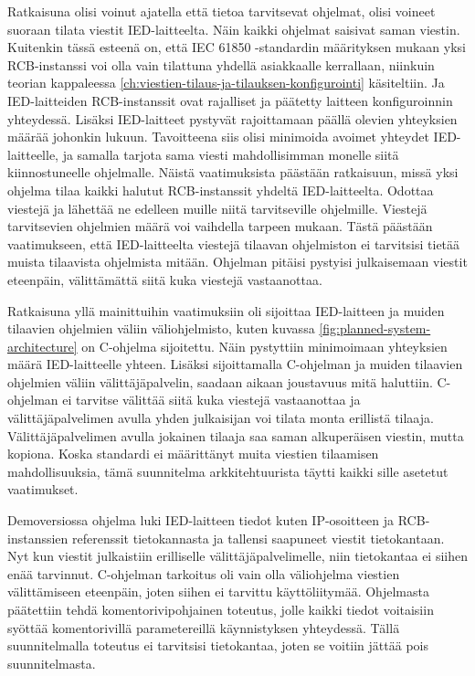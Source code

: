 Ratkaisuna olisi voinut ajatella että tietoa tarvitsevat ohjelmat, olisi voineet suoraan tilata viestit IED-laitteelta. Näin kaikki ohjelmat saisivat saman viestin. Kuitenkin tässä esteenä on, että IEC 61850 -standardin määrityksen mukaan yksi RCB-instanssi voi olla vain tilattuna yhdellä asiakkaalle kerrallaan, niinkuin teorian kappaleessa \ref{ch:viestien-tilaus-ja-tilauksen-konfigurointi} käsiteltiin. Ja IED-laitteiden RCB-instanssit ovat rajalliset ja päätetty laitteen konfiguroinnin yhteydessä. Lisäksi IED-laitteet pystyvät rajoittamaan päällä olevien yhteyksien määrää johonkin lukuun. Tavoitteena siis olisi minimoida avoimet yhteydet IED-laitteelle, ja samalla tarjota sama viesti mahdollisimman monelle siitä kiinnostuneelle ohjelmalle. Näistä vaatimuksista päästään ratkaisuun, missä yksi ohjelma tilaa kaikki halutut RCB-instanssit yhdeltä IED-laitteelta. Odottaa viestejä ja lähettää ne edelleen muille niitä tarvitseville ohjelmille. Viestejä tarvitsevien ohjelmien määrä voi vaihdella tarpeen mukaan. Tästä päästään vaatimukseen, että IED-laitteelta viestejä tilaavan ohjelmiston ei tarvitsisi tietää muista tilaavista ohjelmista mitään. Ohjelman pitäisi pystyisi julkaisemaan viestit eteenpäin, välittämättä siitä kuka viestejä vastaanottaa.

Ratkaisuna yllä mainittuihin vaatimuksiin oli sijoittaa IED-laitteen ja muiden tilaavien ohjelmien väliin väliohjelmisto, kuten kuvassa \ref{fig:planned-system-architecture} on C-ohjelma sijoitettu. Näin pystyttiin minimoimaan yhteyksien määrä IED-laitteelle yhteen. Lisäksi sijoittamalla C-ohjelman ja muiden tilaavien ohjelmien väliin välittäjäpalvelin, saadaan aikaan joustavuus mitä haluttiin. C-ohjelman ei tarvitse välittää siitä kuka viestejä vastaanottaa ja välittäjäpalvelimen avulla yhden julkaisijan voi tilata monta erillistä tilaaja. Välittäjäpalvelimen avulla jokainen tilaaja saa saman alkuperäisen viestin, mutta kopiona. Koska standardi ei määrittänyt muita viestien tilaamisen mahdollisuuksia, tämä suunnitelma arkkitehtuurista täytti kaikki sille asetetut vaatimukset.

Demoversiossa ohjelma luki IED-laitteen tiedot kuten IP-osoitteen ja RCB-instanssien referenssit tietokannasta ja tallensi saapuneet viestit tietokantaan. Nyt kun viestit julkaistiin erilliselle välittäjäpalvelimelle, niin tietokantaa ei siihen enää tarvinnut. C-ohjelman tarkoitus oli vain olla väliohjelma viestien välittämiseen eteenpäin, joten siihen ei tarvittu käyttöliitymää. Ohjelmasta päätettiin tehdä komentorivipohjainen toteutus, jolle kaikki tiedot voitaisiin syöttää komentorivillä parametereillä käynnistyksen yhteydessä. Tällä suunnitelmalla toteutus ei tarvitsisi tietokantaa, joten se voitiin jättää pois suunnitelmasta.


